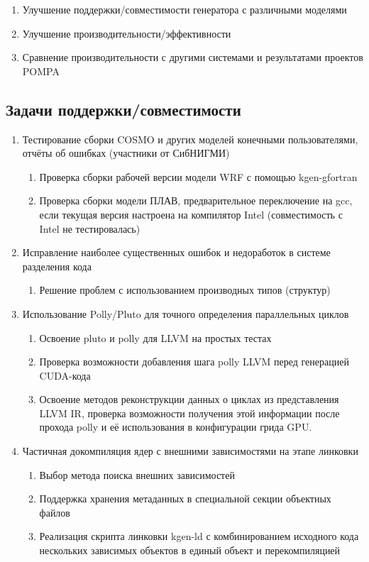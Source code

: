 \documentclass[a4,12pt]{report}
\begin{document}
\begin{enumerate}
\item Улучшение поддержки/совместимости генератора с различными моделями
\item Улучшение производительности/эффективности
\item Сравнение производительности с другими системами и результатами проектов POMPA
\end{enumerate}

\subsection{Задачи поддержки/совместимости}

\begin{enumerate}
\item Тестирование сборки COSMO и других моделей конечными пользователями, отчёты об ошибках (участники от СибНИГМИ)
\begin{enumerate}
\item Проверка сборки рабочей версии модели WRF с помощью kgen-gfortran
\item Проверка сборки модели ПЛАВ, предварительное переключение на gcc, если текущая версия настроена на компилятор Intel (совместимость с Intel не тестировалась)
\end{enumerate}
\item Исправление наиболее существенных ошибок и недоработок в системе разделения кода
\begin{enumerate}
\item Решение проблем с использованием производных типов (структур)
\end{enumerate}
\item Использование Polly/Pluto для точного определения параллельных циклов
\begin{enumerate}
\item Освоение pluto и polly для LLVM на простых тестах
\item Проверка возможности добавления шага polly LLVM перед генерацией CUDA-кода
\item Освоение методов реконструкции данных о циклах из представления LLVM IR, проверка возможности получения этой информации после прохода polly и её использования в конфигурации грида GPU.
\end{enumerate}
\item Частичная докомпиляция ядер с внешними зависимостями на этапе линковки
\begin{enumerate}
\item Выбор метода поиска внешних зависимостей
\item Поддержка хранения метаданных в специальной секции объектных файлов
\item Реализация скрипта линковки kgen-ld с комбинированием исходного кода нескольких зависимых объектов в единый объект и перекомпиляцией
\end{enumerate}
\end{enumerate}
\end{document}
